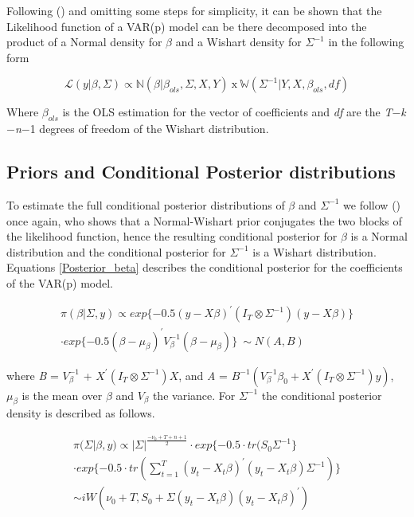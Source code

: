 \documentclass[12pt]{article}
\begin{document}
Following (\cite{canova2007methods}) and omitting some steps for simplicity, it can be shown that the Likelihood function of a VAR(p) model can be there decomposed into the product of a Normal density for $\beta$ and a Wishart density for $\Sigma^{-1}$ in the following form

\begin{equation}\label{Likelihood_2}
\mathcal{L}(y | \beta, \Sigma) \propto \mathbb{N} (\beta | \beta_{ols}, \Sigma, X, Y)\  \text{x} \ \mathbb{W} (\Sigma^{-1} | Y, X, \beta_{ols}, df)
\end{equation}

Where $\beta_{ols}$ is the OLS estimation for the vector of coefficients and \emph{df} are the \emph{T}$-$\emph{k}$-$\emph{n}$-$1 degrees of freedom of the Wishart distribution.

\subsection{Priors and Conditional Posterior distributions}

To estimate the full conditional posterior distributions of $\beta$ and $\Sigma^{-1}$ we follow (\cite{canova2007methods}) once again, who shows that a Normal-Wishart prior conjugates the two blocks of the likelihood function, hence the resulting conditional posterior  for $\beta$ is a Normal distribution and the conditional posterior for $\Sigma^{-1}$ is a Wishart distribution. Equations \ref{Posterior_beta} describes the conditional posterior for the coefficients of the VAR(p) model.

\begin{equation}\label{Posterior_beta}
\begin{split}
\pi(\beta | \Sigma, y) \propto exp\{-0.5(y-X\beta)^{'}(I_{T} \otimes \Sigma^{-1})(y-X\beta)\} \\ \cdot exp\{-0.5(\beta-\mu_{\beta})^{'}V_{\beta}^{-1}(\beta-\mu_{\beta})\} \ \sim N(A, B)
\end{split}
\end{equation}

where \emph{B} = $V_{\beta}^{-1}$ + $X^{'}(I_{T} \otimes \Sigma^{-1})X$, and \emph{A} = $B^{-1}(V_{\beta}^{-1}\beta_{0}+X^{'}(I_{T} \otimes \Sigma^{-1})y)$, $\mu_{\beta}$ is the mean over $\beta$ and $V_{\beta}$ the variance. For $\Sigma^{-1}$ the conditional posterior density is described as follows.

\begin{equation}\label{Posterior_Sigma}
\begin{split}
\pi(\Sigma | \beta, y) \propto |\Sigma| ^{\frac{-\nu_{0}+T+n+1}{2}} \cdot exp\{-0.5 \cdot tr(S_{0}\Sigma^{-1}\}   \\
\cdot exp\{-0.5 \cdot tr(\sum^{T}_{t=1} (y_{t}-X_{t}\beta)^{'}(y_{t}-X_{t}\beta)\Sigma^{-1})\} \\
\sim iW(\nu_{0}+T, S_{0}+\Sigma(y_{t}-X_{t}\beta)(y_{t}-X_{t}\beta)^{'})
\end{split}
\end{equation}
\end{document}
